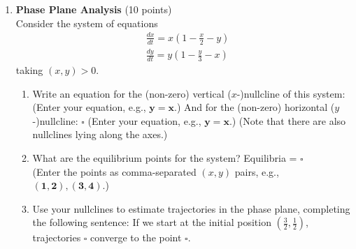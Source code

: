 \begin{enumerate}
  \item \textbf{Phase Plane Analysis} (10 points)\\
  Consider the system of equations
  $$
  \begin{aligned}
  & \frac{d x}{d t}=x\left(1-\frac{x}{2}-y\right) \\
  & \frac{d y}{d t}=y\left(1-\frac{y}{3}-x\right)
  \end{aligned}
  $$
  taking $(x, y)>0$.
  \begin{enumerate}[label=(\alph*)]
    \item Write an equation for the (non-zero) vertical ($x$-)nullcline of this system:
    (Enter your equation, e.g., $\boldsymbol{y}=\boldsymbol{x}$.)
    And for the (non-zero) horizontal ($y$-)nullcline:
    $\square$
    (Enter your equation, e.g., $\boldsymbol{y}=\boldsymbol{x}$.)
    (Note that there are also nullclines lying along the axes.)
    \begin{subanswer}
    \end{subanswer}
    \item What are the equilibrium points for the system?
    Equilibria = $\square$\\
    (Enter the points as comma-separated $(x, y)$ pairs, e.g., $(\mathbf{1 , 2}),(\mathbf{3 , 4})$.)
    \begin{subanswer}
    \end{subanswer}
    \item Use your nullclines to estimate trajectories in the phase plane, completing the following sentence:
    If we start at the initial position $\left(\frac{3}{2}, \frac{1}{2}\right)$, trajectories $\square$ converge to the point $\square$.
    \begin{subanswer}
    \end{subanswer}
  \end{enumerate}


\end{enumerate}

